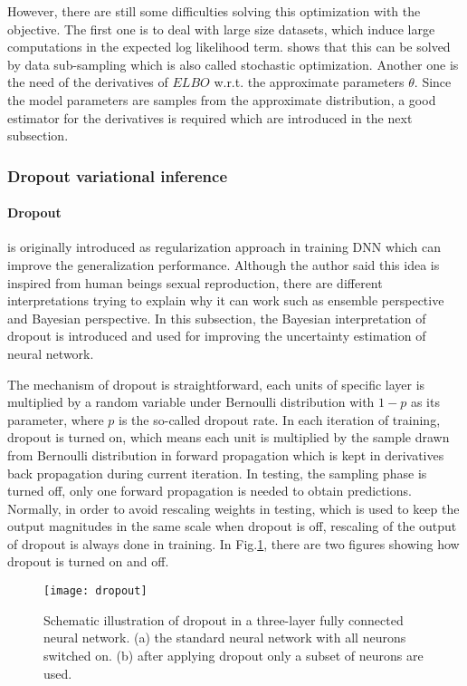 However, there are still some difficulties solving this optimization with the objective. The first one is to deal with large size datasets, which induce large computations in the expected log likelihood term. \cite{graves2011practical} shows
that this can be solved by data sub-sampling which is also called stochastic optimization. Another one is the need of the derivatives of $ELBO$ w.r.t. the approximate parameters $\theta$. Since the model parameters are samples from the approximate distribution, a good estimator for the derivatives is required which are introduced in the next subsection. 

\subsubsection{Dropout variational inference}

\paragraph{Dropout\cite{srivastava2014dropout}} is originally introduced as regularization approach in training DNN which can improve the generalization performance. Although the author said this idea is inspired from human beings sexual reproduction, there are different interpretations trying to explain why it can work such as ensemble perspective and Bayesian perspective. In this subsection, the Bayesian interpretation of dropout is introduced and used for improving the uncertainty estimation of neural network. 

The mechanism of dropout is straightforward, each units of specific layer is multiplied by a random variable under Bernoulli distribution with $1-p$ as its parameter, where $p$ is the so-called dropout rate. In each iteration of training, dropout is turned on, which means each unit is multiplied by the sample drawn from Bernoulli distribution in forward propagation which is kept in derivatives back propagation during current iteration. In testing, the sampling phase is turned off, only one forward propagation is needed to obtain predictions. Normally, in order to avoid rescaling weights in testing, which is used to keep the output magnitudes in the same scale when dropout is off, rescaling of the output of dropout is always done in training. In Fig.\ref{fig:dropout}, there are two figures showing how dropout is turned on and off. 

\begin{figure}[H]
	\begin{center}
		\texttt{[image: dropout]}
		\caption{Schematic illustration of dropout in a three-layer fully connected neural network. (a) the standard neural network with all neurons switched on. (b) after applying dropout only a subset of neurons are used\cite{srivastava2014dropout}.}		
		\label{fig:dropout}
	\end{center}
\end{figure}


